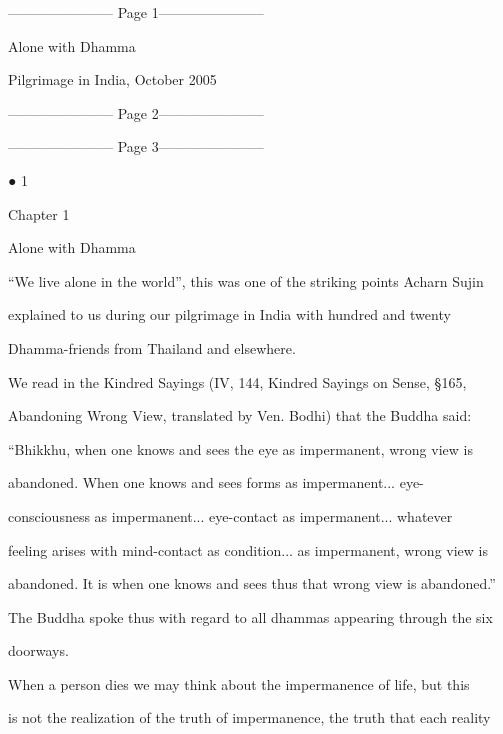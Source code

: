 ﻿----------------------- Page 1-----------------------

Alone with Dhamma 



                                          Pilgrimage in India, October 2005 


----------------------- Page 2-----------------------


----------------------- Page 3-----------------------

                                                                                          ● 1 



 Chapter 1 



Alone with Dhamma 



“We live alone in the world”, this was one of the striking points Acharn Sujin  

explained   to   us  during   our   pilgrimage   in   India   with   hundred   and   twenty  

Dhamma-friends from Thailand and elsewhere. 



   We read in the Kindred  Sayings  (IV,  144, Kindred  Sayings on  Sense,  §165,  

Abandoning Wrong View, translated by Ven. Bodhi) that the Buddha said: 



      “Bhikkhu, when one knows and sees the eye as impermanent, wrong view is  

      abandoned. When one knows and sees forms as impermanent... eye- 

      consciousness as impermanent... eye-contact as impermanent... whatever  

      feeling arises with mind-contact as condition... as impermanent, wrong view is  

      abandoned. It is when one knows and sees thus that wrong view is abandoned.” 



The Buddha spoke thus with regard to all dhammas appearing through the six  

doorways. 

   When a person dies we may think about the impermanence of life, but this  

is not the realization of the truth of impermanence, the truth that each reality  

